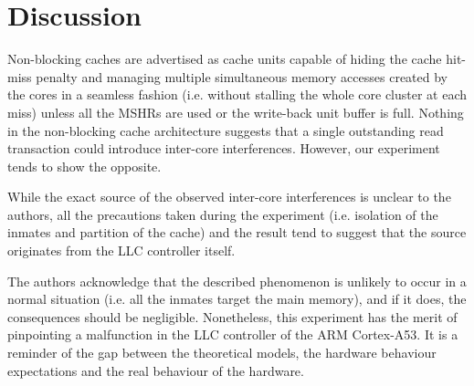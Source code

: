 \section{Discussion}
    Non-blocking caches are advertised as cache units capable of hiding the cache hit-miss penalty and managing multiple simultaneous memory accesses created by the cores in a seamless fashion (i.e. without stalling the whole core cluster at each miss) unless all the MSHRs are used or the write-back unit buffer is full.
    Nothing in the non-blocking cache architecture suggests that a single outstanding read transaction could introduce inter-core interferences. However, our experiment tends to show the opposite.

    While the exact source of the observed inter-core interferences is unclear to the authors, all the precautions taken during the experiment (i.e. isolation of the inmates and partition of the cache) and the result tend to suggest that the source originates from the LLC controller itself.

    The authors acknowledge that the described phenomenon is unlikely to occur in a normal situation (i.e. all the inmates target the main memory), and if it does, the consequences should be negligible.
    Nonetheless, this experiment has the merit of pinpointing a malfunction in the LLC controller of the ARM Cortex-A53.
    It is a reminder of the gap between the theoretical models, the hardware behaviour expectations and the real behaviour of the hardware.


